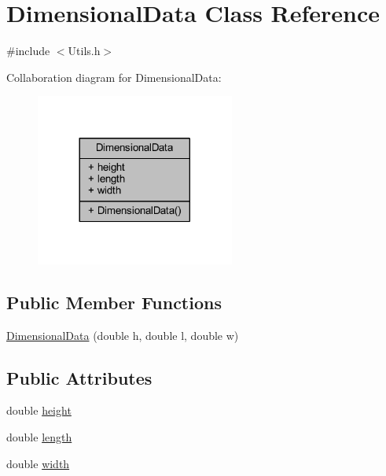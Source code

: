\hypertarget{class_dimensional_data}{}\section{Dimensional\+Data Class Reference}
\label{class_dimensional_data}


{\ttfamily \#include $<$Utils.\+h$>$}



Collaboration diagram for Dimensional\+Data\+:
\nopagebreak
\begin{figure}[H]
\begin{center}
\leavevmode
\includegraphics[width=185pt]{class_dimensional_data__coll__graph}
\end{center}
\end{figure}
\subsection*{Public Member Functions}
\begin{DoxyCompactItemize}
\item 
\hyperlink{class_dimensional_data_a85c1d983a7dbe67ed9d93336e37b2b74}{Dimensional\+Data} (double h, double l, double w)
\end{DoxyCompactItemize}
\subsection*{Public Attributes}
\begin{DoxyCompactItemize}
\item 
double \hyperlink{class_dimensional_data_ad5deedd58ab9d79954d33780f0e2fce2}{height}
\item 
double \hyperlink{class_dimensional_data_a07f712bbdabdc7cadc671feb480065a4}{length}
\item 
double \hyperlink{class_dimensional_data_a5ed5474d8c61c0871189f083c76a39f9}{width}
\end{DoxyCompactItemize}


